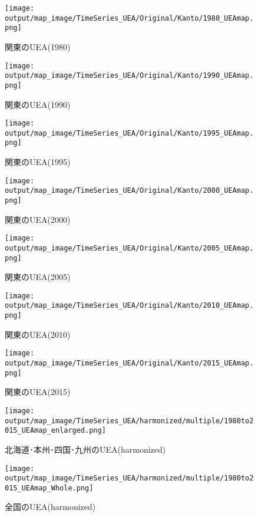 \documentclass{ltjsarticle}
\begin{document}
\begin{figure}[pbth]
  \centering
  \texttt{[image: output/map\_image/TimeSeries\_UEA/Original/Kanto/1980\_UEAmap.png]}
  \caption{\label{ori:1980UEA:kan}関東のUEA(1980)}
\end{figure}
\begin{figure}[pbth]
  \centering
  \texttt{[image: output/map\_image/TimeSeries\_UEA/Original/Kanto/1990\_UEAmap.png]}
  \caption{\label{ori:1990UEA:kan}関東のUEA(1990)}
\end{figure}
\begin{figure}[pbth]
  \centering
  \texttt{[image: output/map\_image/TimeSeries\_UEA/Original/Kanto/1995\_UEAmap.png]}
  \caption{\label{ori:1995UEA:kan}関東のUEA(1995)}
\end{figure}
\begin{figure}[pbth]
  \centering
  \texttt{[image: output/map\_image/TimeSeries\_UEA/Original/Kanto/2000\_UEAmap.png]}
  \caption{\label{ori:2000UEA:kan}関東のUEA(2000)}
\end{figure}
\begin{figure}[pbth]
  \centering
  \texttt{[image: output/map\_image/TimeSeries\_UEA/Original/Kanto/2005\_UEAmap.png]}
  \caption{\label{ori:2005UEA:kan}関東のUEA(2005)}
\end{figure}
\begin{figure}[pbth]
  \centering
  \texttt{[image: output/map\_image/TimeSeries\_UEA/Original/Kanto/2010\_UEAmap.png]}
  \caption{\label{ori:2010UEA:kan}関東のUEA(2010)}
\end{figure}
\begin{figure}[pbth]
  \centering
  \texttt{[image: output/map\_image/TimeSeries\_UEA/Original/Kanto/2015\_UEAmap.png]}
  \caption{\label{ori:2015UEA:kan}関東のUEA(2015)}
\end{figure}

\begin{figure}[pbth]
  \centering
  \texttt{[image: output/map\_image/TimeSeries\_UEA/harmonized/multiple/1980to2015\_UEAmap\_enlarged.png]}
  \caption{\label{ham:tsUEA:enl}北海道･本州･四国･九州のUEA(harmonized)}
\end{figure}

\begin{figure}[pbth]
  \centering
  \texttt{[image: output/map\_image/TimeSeries\_UEA/harmonized/multiple/1980to2015\_UEAmap\_Whole.png]}
  \caption{\label{ham:tsUEA:who}全国のUEA(harmonized)}
\end{figure}
\end{document}
